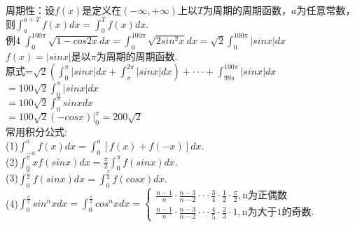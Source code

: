\documentclass[UTF8]{ctexart}
\begin{document}
\\ 周期性：设$f(x)$是定义在$(-\infty,+\infty)$上以$T$为周期的周期函数，$a$为任意常数，则$\displaystyle{\int_a^{a+T} f(x)dx=\int _0^T f(x)dx}$.
\\ 例4 $\displaystyle{\int _0^{100\pi} \sqrt{1-cos2x}dx=\int_0^{100\pi} \sqrt{2sin^2x}dx=\sqrt{2}\int_0^{100\pi}|sinx|dx}$
\\ $f(x)=|sinx|$是以$\pi$为周期的周期函数.
\\ 原式=$\displaystyle{\sqrt{2}(\int_0^{\pi}|sinx|dx+\int_\pi^{2\pi}|sinx|dx)+\cdot\cdot\cdot+\int_{99\pi}^{100\pi}|sinx|dx}$
\\$=\displaystyle{100\sqrt{2} \int_0^\pi |sinx|dx}$
\\$=\displaystyle{100\sqrt{2}\int_0^\pi sinxdx}$
\\$=\displaystyle{100\sqrt{2}(-cosx)|_0^\pi=200\sqrt{2}}$
\\ 常用积分公式:
\\ (1)$\displaystyle{\int_{-a}^a f(x)dx=\int _0^a [f(x)+f(-x)]dx}.$
\\(2)$\displaystyle{\int_0^\pi xf(sinx)dx=\frac{\pi}{2}\int_0^\pi f(sinx)dx.}$
\\(3)$\displaystyle{\int _0^{\frac{\pi}{2}} f(sinx)dx=\int _0^{\frac{\pi}{2}} f(cosx)dx.}$
\\(4)$\displaystyle{\int _0^{\frac{\pi}{2}} sin^nxdx =\int _0^{\frac{\pi}{2}} cos^nxdx=\left\{
\begin {array}{rcl}
\frac{n-1}{n}\cdot\frac{n-3}{n-2}\cdot\cdot\cdot\frac{3}{4}\cdot\frac{1}{2}\cdot\frac{\pi}{2},\mbox{n为正偶数}\\
\frac{n-1}{n}\cdot\frac{n-3}{n-2}\cdot\cdot\cdot\frac{4}{5}\cdot\frac{2}{3}\cdot1,\mbox{n为大于1的奇数.}
\end{array}\right.}$
\end{document}
